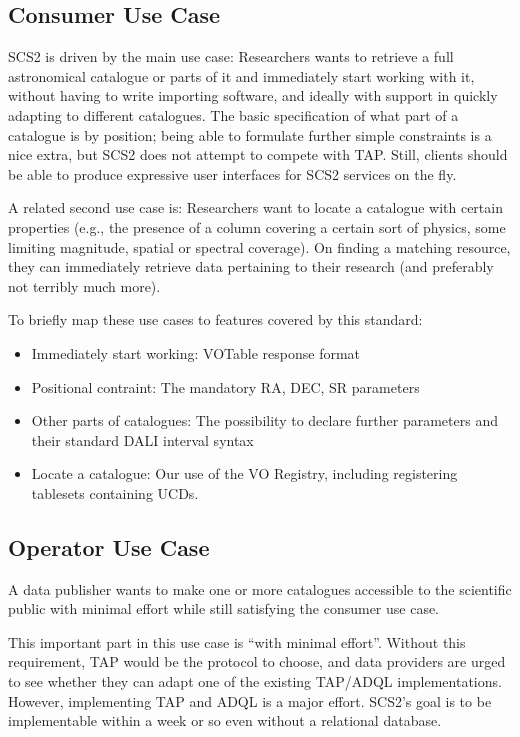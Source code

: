\documentclass[11pt,a4paper]{ivoa}
\begin{document}
\subsection{Consumer Use Case}

SCS2 is driven by the main use case: Researchers wants to retrieve a
full astronomical catalogue or parts of it and immediately start working
with it, without having to write importing software, and ideally with
support in quickly adapting to different catalogues.  The basic
specification of what part of a catalogue is by position; being able to
formulate further simple constraints is a nice extra, but SCS2 does not
attempt to compete with TAP.  Still, clients should be able to produce
expressive user interfaces for SCS2 services on the fly.

A related second use case is: Researchers want to locate a catalogue
with certain properties (e.g., the presence of a column covering a
certain sort of physics, some limiting magnitude, spatial or spectral
coverage).  On finding a matching resource, they can immediately
retrieve
data pertaining to their research (and preferably not terribly much
more).

To briefly map these use cases to features covered by this standard:

\begin{itemize}
\item Immediately start working: VOTable response format
\item Positional contraint: The mandatory RA, DEC, SR parameters
\item Other parts of catalogues: The possibility to declare further
parameters and their standard DALI interval syntax
\item Locate a catalogue: Our use of the VO Registry, including
registering tablesets containing UCDs.
\end{itemize}


\subsection{Operator Use Case}

A data publisher wants to make one or more catalogues accessible to the
scientific public with minimal effort while still satisfying the
consumer use case.

This important part in this use case is ``with minimal effort''.
Without this requirement, TAP would be the protocol to choose, and data
providers are urged to see whether they can adapt one of the existing
TAP/ADQL implementations.  However, implementing TAP and ADQL is a major
effort.  SCS2's goal is to be implementable within a week or so even
without a relational database.
\end{document}
